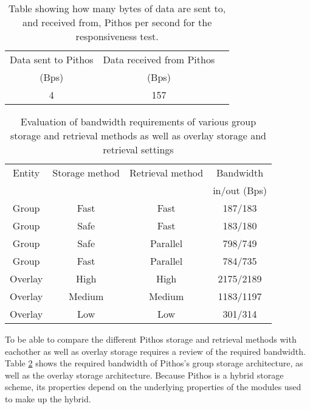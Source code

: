 \begin{table}[htbp]
\centering
\begin{tabular}{|c|c|c|}
\hline
Data sent to Pithos   & Data received from Pithos\\
 (Bps)                &          (Bps)           \\
\hline
        4             &          157             \\
\hline
\end{tabular}
\caption{Table showing how many bytes of data are sent to, and received from, Pithos per second for the responsiveness test.}
\label{tab_higher_data_results_resp}
\end{table}

\begin{table}[htbp]
\centering
\begin{tabular}{|c|c|c|c|}
\hline
Entity & Storage method & Retrieval method     & Bandwidth\\
       &                &                      & in/out (Bps)\\
\hline
Group   &   Fast        &   Fast               &   187/183\\
Group   &   Safe        &   Fast               &   183/180\\
Group   &   Safe        &   Parallel           &   798/749\\
Group   &   Fast        &   Parallel           &   784/735\\
\hline
Overlay &   High        &   High               &  2175/2189\\
Overlay &   Medium      &   Medium             &  1183/1197\\
Overlay &   Low         &   Low                &  301/314  \\
\hline
\end{tabular}
\caption{Evaluation of bandwidth requirements of various group storage and retrieval methods as well as overlay storage and retrieval settings}
\label{tab_bandwidth_results}
\end{table}

To be able to compare the different Pithos storage and retrieval methods with eachother as well as overlay storage requires a review of the required bandwidth. Table \ref{tab_bandwidth_results} shows the required bandwidth of Pithos's group storage architecture, as well as the overlay storage architecture. Because Pithos is a hybrid storage scheme, its properties depend on the underlying properties of the modules used to make up the hybrid.

